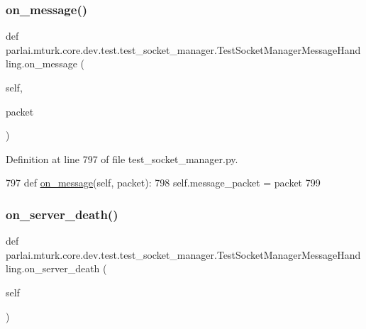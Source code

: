 \subsubsection{\texorpdfstring{on\+\_\+message()}{on\_message()}}
{\footnotesize\ttfamily def parlai.\+mturk.\+core.\+dev.\+test.\+test\+\_\+socket\+\_\+manager.\+Test\+Socket\+Manager\+Message\+Handling.\+on\+\_\+message (\begin{DoxyParamCaption}\item[{}]{self,  }\item[{}]{packet }\end{DoxyParamCaption})}



Definition at line 797 of file test\+\_\+socket\+\_\+manager.\+py.


\begin{DoxyCode}
797     \textcolor{keyword}{def }\hyperlink{namespaceparlai_1_1chat__service_1_1services_1_1browser__chat_1_1client_a01c1536b48e2f5badd2fe58ea02b9a5c}{on\_message}(self, packet):
798         self.message\_packet = packet
799 
\end{DoxyCode}
\mbox{\label{classparlai_1_1mturk_1_1core_1_1dev_1_1test_1_1test__socket__manager_1_1TestSocketManagerMessageHandling_aa370a7cf8fc2cb4180cf28a06b057d5b}} 
\subsubsection{\texorpdfstring{on\+\_\+server\+\_\+death()}{on\_server\_death()}}
{\footnotesize\ttfamily def parlai.\+mturk.\+core.\+dev.\+test.\+test\+\_\+socket\+\_\+manager.\+Test\+Socket\+Manager\+Message\+Handling.\+on\+\_\+server\+\_\+death (\begin{DoxyParamCaption}\item[{}]{self }\end{DoxyParamCaption})}



